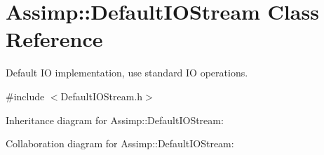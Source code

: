 \hypertarget{class_assimp_1_1_default_i_o_stream}{\section{Assimp\+:\+:Default\+I\+O\+Stream Class Reference}
\label{class_assimp_1_1_default_i_o_stream}
}


Default I\+O implementation, use standard I\+O operations.  




{\ttfamily \#include $<$Default\+I\+O\+Stream.\+h$>$}



Inheritance diagram for Assimp\+:\+:Default\+I\+O\+Stream\+:


Collaboration diagram for Assimp\+:\+:Default\+I\+O\+Stream\+:

